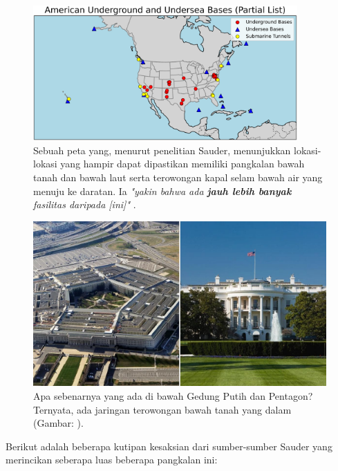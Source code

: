 \documentclass[10pt,twocolumn,letterpaper]{article}
\begin{document}
\begin{figure}[t]
\begin{center}
\includegraphics[width=0.9\textwidth]{basescrop.png}
\end{center}
   \caption{Sebuah peta yang, menurut penelitian Sauder, menunjukkan lokasi-lokasi yang hampir dapat dipastikan memiliki pangkalan bawah tanah dan bawah laut serta terowongan kapal selam bawah air yang menuju ke daratan. Ia \textit{"yakin bahwa ada \textbf{jauh lebih banyak} fasilitas daripada [ini]"} \cite{22}.}
   \label{fig:4}
\end{figure}

\begin{figure}[t]
\begin{center}
   \includegraphics[width=1\linewidth]{penta.jpg}
\end{center}
   \caption{Apa sebenarnya yang ada di bawah Gedung Putih dan Pentagon? Ternyata, ada jaringan terowongan bawah tanah yang dalam (Gambar: \cite{31}).}
\label{fig:3}
\label{fig:onecol}
\end{figure}

Berikut adalah beberapa kutipan kesaksian dari sumber-sumber Sauder yang merincikan seberapa luas beberapa pangkalan ini:
\end{document}
